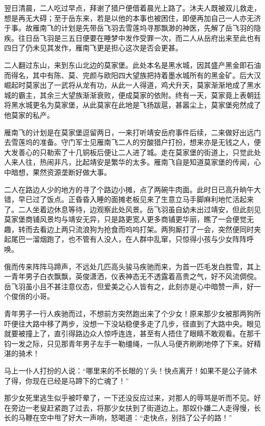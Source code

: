 翌日清晨，二人吃过早点，拜谢了猎户便借着晨光上路了。沐夫人既被双儿救走，想是再无大碍；至于岳东来，若是以他的本事也被困住，即便再加自己一人亦无济于事。故雁南飞的计划是先带岳飞羽去雪莲坞寻那飘渺的神医，先解了岳飞羽的隐疾。往日岳飞羽是三五日便要在睡梦中发作受罪一次，而二人从岳府出来至此也有四日了仍未见其发作，雁南飞更是担心这次是否会更甚。

二人翻过东山，来到东山北边的莫家堡。此处本名是黑水城，因其盛产黑金即石油而得名，其中有陈、莫、完颜与欧阳四大望族把持着墨水城所有的黑金矿。后大汉崛起时莫家出了一武将从龙有功，从此一人得道，鸡犬升天，莫家渐渐地成了黑水城的霸主，其余三大望族渐渐衰败，便成莫家的依附。终有一天，莫家竟上表朝廷将黑水城更名为莫家堡，从此莫家在此地是飞扬跋扈，甚嚣尘上，莫家堡宛然成了他莫家的私产。

雁南飞的计划是在莫家堡逗留两日，一来打听靖安岳府事件后续，二来做好出远门去雪莲坞的准备。守门军士见雁南飞二人的穷酸猎户打扮，想来亦是无钱之人，便大发善心的只勒索了十几铜板后便让二人进了城。走在莫家堡的街道上，只觉此处人来人往，热闹非凡，比起靖安是繁华的太多。雁南飞自是知道莫家堡的传闻，心中暗想，果然资源垄断好做大事。

二人在路边人少的地方的寻了个路边小摊，点了两碗牛肉面。此时日已高升晌午大错，早已过了饭点。正昏昏入睡的面摊老板见来了生意立马手脚麻利地忙活起来了。二人坐着边休息等待，边观察此处风景。岳飞羽虽自幼未出过靖安，但此刻见莫家堡商铺风景均与靖安无异，只是路更宽人更多商铺更华丽，瞧了一会便觉无趣，转而去看边上两只流浪狗为抢食而呜呜打架。两狗厮打了一会，突然便同时夹起尾巴一溜烟跑了，也不管有人没人，在人群中乱窜，只惊得小孩与少女阵阵呼唤。

俄而传来阵阵马蹄声，不远处几匹高头骏马疾驰而来，为首一匹毛发白胜雪，其上一青年男子白衣飘飘，英俊潇洒，仪表神态无不透露着高贵之气，好不风流倜傥。岳飞羽虽小且不甚注意仪态，但爱美之心人皆有之，此刻亦是心中暗赞一声，好一个俊俏的小哥。

青年男子一行人疾驰而过，不想前方突然跑出来了个少女！原来那少女被那两狗所吓便往大路中移了两步，没想一下没站稳便多走了几步，径直到了大路中央。眼见就要被撞上了，直引得路边众人惊呼连连，甚至有人捂住了眼睛不敢观看。在那千钧一发之际，只见那青年男子左手一勒缰绳，一队人马便齐刷刷地停了下来。好精湛的骑术！

马上一仆人打扮的人说：“哪里来的不长眼的丫头！快点离开！如果不是公子骑术了得，你现在已经是马蹄下的亡魂了！”

那少女死里逃生似乎被吓晕了，一下还没反应过来，对那人的辱骂是听而不见。好在旁边一老叟赶紧跑了过去，将那少女扶到了街道边上。那奴仆嫌二人走得慢，长长的马鞭在空中甩了好大一声响，怒喝道：“走快点，别挡了公子的路！”

